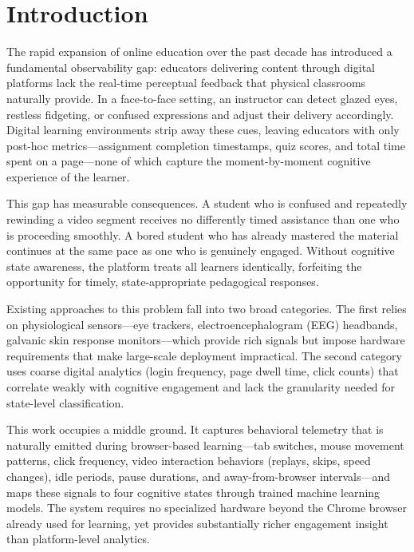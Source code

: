 \documentclass[conference]{IEEEtran}
\begin{document}
\section{Introduction}

The rapid expansion of online education over the past decade has introduced a fundamental observability gap: educators delivering content through digital platforms lack the real-time perceptual feedback that physical classrooms naturally provide. In a face-to-face setting, an instructor can detect glazed eyes, restless fidgeting, or confused expressions and adjust their delivery accordingly. Digital learning environments strip away these cues, leaving educators with only post-hoc metrics---assignment completion timestamps, quiz scores, and total time spent on a page---none of which capture the moment-by-moment cognitive experience of the learner.

This gap has measurable consequences. A student who is confused and repeatedly rewinding a video segment receives no differently timed assistance than one who is proceeding smoothly. A bored student who has already mastered the material continues at the same pace as one who is genuinely engaged. Without cognitive state awareness, the platform treats all learners identically, forfeiting the opportunity for timely, state-appropriate pedagogical responses.

Existing approaches to this problem fall into two broad categories. The first relies on physiological sensors---eye trackers, electroencephalogram (EEG) headbands, galvanic skin response monitors---which provide rich signals but impose hardware requirements that make large-scale deployment impractical. The second category uses coarse digital analytics (login frequency, page dwell time, click counts) that correlate weakly with cognitive engagement and lack the granularity needed for state-level classification.

This work occupies a middle ground. It captures behavioral telemetry that is naturally emitted during browser-based learning---tab switches, mouse movement patterns, click frequency, video interaction behaviors (replays, skips, speed changes), idle periods, pause durations, and away-from-browser intervals---and maps these signals to four cognitive states through trained machine learning models. The system requires no specialized hardware beyond the Chrome browser already used for learning, yet provides substantially richer engagement insight than platform-level analytics.
\end{document}
